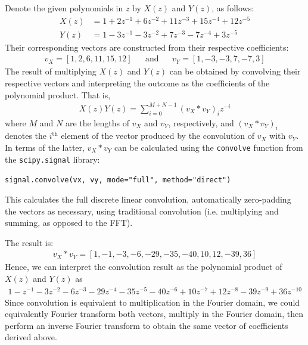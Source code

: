 \documentclass[a4paper, 11pt]{article}
\begin{document}
Denote the given polynomials in $z$ by $X(z)$ and $Y(z)$, as follows:
\begin{align*}
    X(z) &= 1 + 2z^{-1} + 6z^{-2} + 11z^{-3} + 15z^{-4} + 12z^{-5} \\
    Y(z) &= 1 - 3z^{-1} - 3z^{-2} + 7z^{-3} - 7z^{-4} + 3z^{-5}
\end{align*}
Their corresponding vectors are constructed from their respective coefficients:
\begin{align*}
    v_X = [1, 2, 6, 11, 15, 12] && \text{and} && v_Y = [1, -3, -3, 7, -7, 3]
\end{align*}
The result of multiplying $X(z)$ and $Y(z)$ can be obtained by convolving their
respective vectors and interpreting the outcome as the coefficients of the
polynomial product. That is,
\begin{align*}
    X(z)Y(z) = \sum_{i=0}^{M+N-1} (v_X \ast v_Y)_i z^{-i}
\end{align*}
where $M$ and $N$ are the lengths of $v_X$ and $v_Y$, respectively, and
$(v_X\ast v_Y)_i$ denotes the $i^\text{th}$ element of the vector produced by
the convolution of $v_X$ with $v_Y$. In terms of the latter, $v_X\ast v_Y$ can
be calculated using the \texttt{convolve} function from the
\texttt{scipy.signal} library:
\begin{center}
    \texttt{signal.convolve(vx, vy, mode="full", method="direct")}
\end{center}
This calculates the full discrete linear convolution, automatically
zero-padding the vectors as necessary, using traditional convolution (i.e.
multiplying and summing, as opposed to the FFT).

The result is:
\begin{align*}
    v_X \ast v_Y = [1, -1, -3, -6, -29, -35, -40, 10, 12, -39, 36]
\end{align*}
Hence, we can interpret the convolution result as the polynomial product of
$X(z)$ and $Y(z)$ as
\begin{align*}
    1 - z^{-1} - 3z^{-2} - 6z^{-3} - 29z^{-4} - 35z^{-5} - 40z^{-6} + 10z^{-7} +
    12z^{-8} - 39z^{-9} + 36z^{-10}
\end{align*}
Since convolution is equivalent to multiplication in the Fourier domain, we
could equivalently Fourier transform both vectors, multiply in the Fourier
domain, then perform an inverse Fourier transform to obtain the same vector of
coefficients derived above.
\end{document}
